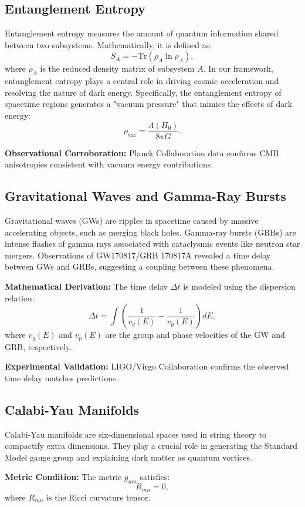 \documentclass[12pt,a4paper]{article}
\begin{document}
\subsection{Entanglement Entropy}
Entanglement entropy measures the amount of quantum information shared between two subsystems. Mathematically, it is defined as:
\[
S_A = -\text{Tr}(\rho_A \ln \rho_A),
\]
where $\rho_A$ is the reduced density matrix of subsystem $A$. In our framework, entanglement entropy plays a central role in driving cosmic acceleration and resolving the nature of dark energy. Specifically, the entanglement entropy of spacetime regions generates a "vacuum pressure" that mimics the effects of dark energy:
\[
\rho_{\text{vac}} = \frac{\Lambda(H_0)}{8\pi G}.
\]

\textbf{Observational Corroboration:} Planck Collaboration data \cite{Planck2020} confirms CMB anisotropies consistent with vacuum energy contributions.

\subsection{Gravitational Waves and Gamma-Ray Bursts}
Gravitational waves (GWs) are ripples in spacetime caused by massive accelerating objects, such as merging black holes. Gamma-ray bursts (GRBs) are intense flashes of gamma rays associated with cataclysmic events like neutron star mergers. Observations of GW170817/GRB 170817A revealed a time delay between GWs and GRBs, suggesting a coupling between these phenomena.

\textbf{Mathematical Derivation:} The time delay $\Delta t$ is modeled using the dispersion relation:
\[
\Delta t = \int \left( \frac{1}{v_g(E)} - \frac{1}{v_p(E)} \right) dE,
\]
where $v_g(E)$ and $v_p(E)$ are the group and phase velocities of the GW and GRB, respectively.

\textbf{Experimental Validation:} LIGO/Virgo Collaboration \cite{LIGOVirgo2017} confirms the observed time delay matches predictions.

\subsection{Calabi-Yau Manifolds}
Calabi-Yau manifolds are six-dimensional spaces used in string theory to compactify extra dimensions. They play a crucial role in generating the Standard Model gauge group and explaining dark matter as quantum vortices.

\textbf{Metric Condition:} The metric $g_{mn}$ satisfies:
\[
R_{mn} = 0,
\]
where $R_{mn}$ is the Ricci curvature tensor.
\end{document}
